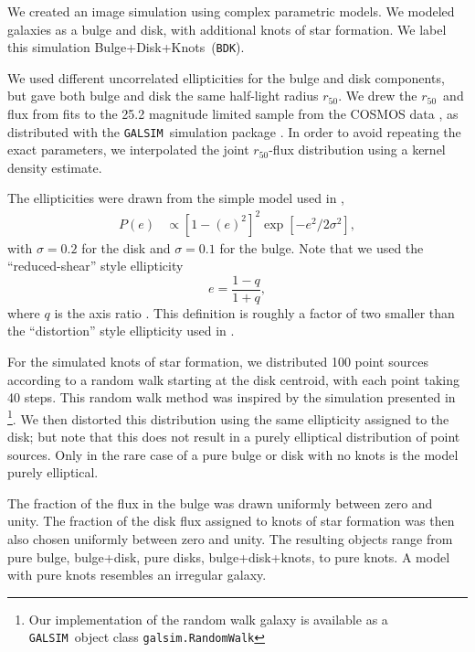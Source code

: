 \documentclass[iop]{emulateapj}
\newcommand{\hlr}{$r_{50}$}
\newcommand{\bdkfull}{Bulge+Disk+Knots}
\newcommand{\bdksim}{\texttt{BDK}}
\newcommand{\galsim}{\texttt{GALSIM}}
\begin{document}
We created an image simulation using complex parametric models.  We modeled
galaxies as a bulge and disk, with additional knots of star formation.  We
label this simulation \bdkfull\ (\bdksim).

We used different uncorrelated ellipticities for the bulge and disk
components, but gave both bulge and disk the same half-light radius \hlr.
We drew the \hlr\ and flux from fits \citep{LacknerGunn2012} to the 25.2
magnitude limited sample from the COSMOS data
\citep{Scoville2007a,Scoville2007b}, as distributed with the \galsim\
simulation package \citep{GALSIM2015}.  In order to avoid repeating the exact
parameters, we interpolated the joint \hlr-flux distribution using a kernel
density estimate.

The ellipticities were drawn from the simple model used in \cite{bfd2016},
\begin{align} \label{eq:edist}
    P(e) &\propto \left[1-(e)^2\right]^2 \exp\left[-e^2/2\sigma^2\right],
\end{align}
with $\sigma=0.2$ for the disk and $\sigma=0.1$ for the bulge.  Note that we
used the ``reduced-shear'' style ellipticity
\begin{equation}
    e = \frac{1-q}{1+q},
\end{equation}
where $q$ is the axis ratio \citep{bj02}.  This definition is roughly a
factor of two smaller than the ``distortion'' style ellipticity
used in \citet{bfd2016}.

For the simulated knots of star formation, we distributed 100 point sources
according to a random walk starting at the disk centroid, with each point
taking 40 steps.  This random walk method was inspired by the simulation
presented in \cite{Zhang2008FourierQuadI}\footnote{Our implementation of the
random walk galaxy is available as a \galsim\ object class
\texttt{galsim.RandomWalk}}.  We then distorted this distribution using the
same ellipticity assigned to the disk; but note that this does not result in a
purely elliptical distribution of point sources.  Only in the rare case of a
pure bulge or disk with no knots is the model purely elliptical.

The fraction of the flux in the bulge was drawn uniformly between zero and
unity.  The fraction of the disk flux assigned to knots of star formation
was then also chosen uniformly between zero and unity.  The resulting 
objects range from pure bulge, bulge+disk, pure disks, bulge+disk+knots, 
to pure knots. A model with pure knots resembles an irregular galaxy.
\end{document}
